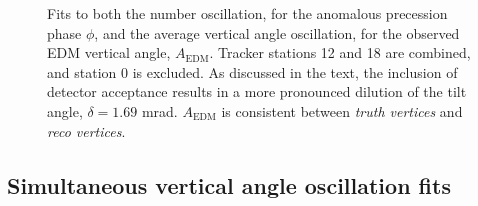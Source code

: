 {\begin{figure}[]
\hfill
{}
\caption{Fits to both the number oscillation, for the anomalous precession phase $\phi$, and the average vertical angle oscillation, for the observed EDM vertical angle, $A_{\text{EDM}}$. Tracker stations 12 and 18 are combined, and station 0 is excluded. As discussed in the text, the inclusion of detector acceptance results in a more pronounced dilution of the tilt angle, $\delta = 1.69$ mrad. $A_{\text{EDM}}$ is consistent between \textit{truth vertices} and \textit{reco vertices}.}
\label{fig:BasicSimFits}
\end{figure}
\clearpage
} 

\subsection{Simultaneous vertical angle oscillation fits}\label{subsec:BasicVertAngFitsSim}

